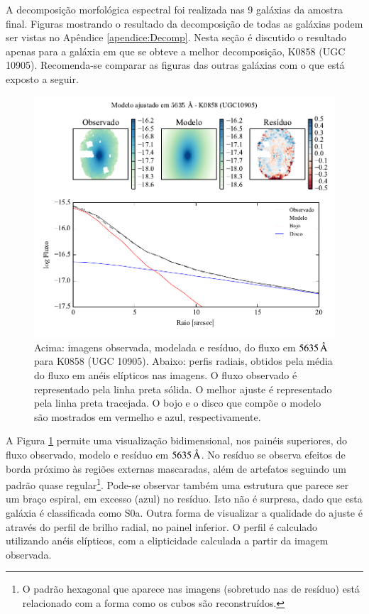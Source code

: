 A decomposição morfológica espectral foi realizada nas 9 galáxias da amostra
final. Figuras mostrando o resultado da decomposição de todas as galáxias podem
ser vistas no Apêndice \ref{apendice:Decomp}. Nesta seção é discutido o
resultado apenas para a galáxia em que se obteve a melhor decomposição, K0858
(UGC 10905). Recomenda-se comparar as figuras das outras galáxias com o que está
exposto a seguir.

\begin{figure}
	\includegraphics[page=1]{figuras-decomp/K0858_sample006a}
	\caption[Ajuste morfológico em $5635\,\angstrom$ para K0858 (UGC 10905)]
	{Acima: imagens observada, modelada e resíduo, do fluxo em $5635\,\angstrom$
	para K0858 (UGC 10905). Abaixo: perfis radiais, obtidos pela média do fluxo em
	anéis elípticos nas imagens. O fluxo observado é representado pela linha preta
	sólida. O melhor ajuste é representado pela linha preta tracejada. O bojo e o
	disco que compõe o modelo são mostrados em vermelho e azul, respectivamente.}
	\label{fig:decompRadprof}
\end{figure}

A Figura \ref{fig:decompRadprof} permite uma visualização bidimensional, nos
painéis superiores, do fluxo observado, modelo e resíduo em $5635\,\angstrom$.
No resíduo se observa efeitos de borda próximo às regiões externas mascaradas,
além de artefatos seguindo um padrão quase regular\footnote{O padrão hexagonal
que aparece nas imagens (sobretudo nas de resíduo) está relacionado com a forma
como os cubos são reconstruídos.}. Pode-se observar também uma estrutura que
parece ser um braço espiral, em excesso (azul) no resíduo. Isto não é surpresa,
dado que esta galáxia é classificada como S0a. Outra forma de visualizar a
qualidade do ajuste é através do perfil de brilho radial, no painel inferior. O
perfil é calculado utilizando anéis elípticos, com a elipticidade calculada a
partir da imagem observada.

